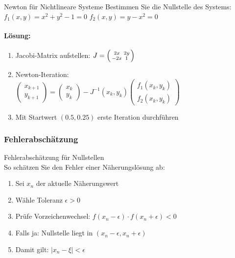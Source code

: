 \begin{example2}{Newton für Nichtlineare Systeme}
Bestimmen Sie die Nullstelle des Systems:
$f_1(x,y) = x^2 + y^2 - 1 = 0$
$f_2(x,y) = y - x^2 = 0$

\paragraph{Lösung:}
\begin{enumerate}
    \item Jacobi-Matrix aufstellen:
    $J = \begin{psmallmatrix} 
    2x & 2y \\
    -2x & 1
    \end{psmallmatrix}$
    
    \item Newton-Iteration:\\
    $\begin{pmatrix} x_{k+1} \\ y_{k+1} \end{pmatrix} = 
    \begin{pmatrix} x_k \\ y_k \end{pmatrix} - 
    J^{-1}(x_k,y_k) \begin{pmatrix} f_1(x_k,y_k) \\ f_2(x_k,y_k) \end{pmatrix}$
    
    \item Mit Startwert $(0.5, 0.25)$ erste Iteration durchführen
\end{enumerate}
\end{example2}






\subsubsection{Fehlerabschätzung}

\begin{KR}{Fehlerabschätzung für Nullstellen}\\
So schätzen Sie den Fehler einer Näherungslösung ab:
\begin{enumerate}
    \item Sei $x_n$ der aktuelle Näherungswert
    \item Wähle Toleranz $\epsilon > 0$
    \item Prüfe Vorzeichenwechsel: $f(x_n-\epsilon) \cdot f(x_n+\epsilon) < 0$
    \item Falls ja: Nullstelle liegt in $(x_n-\epsilon, x_n+\epsilon)$
    \item Damit gilt: $|x_n-\xi| < \epsilon$
\end{enumerate}
\end{KR}


